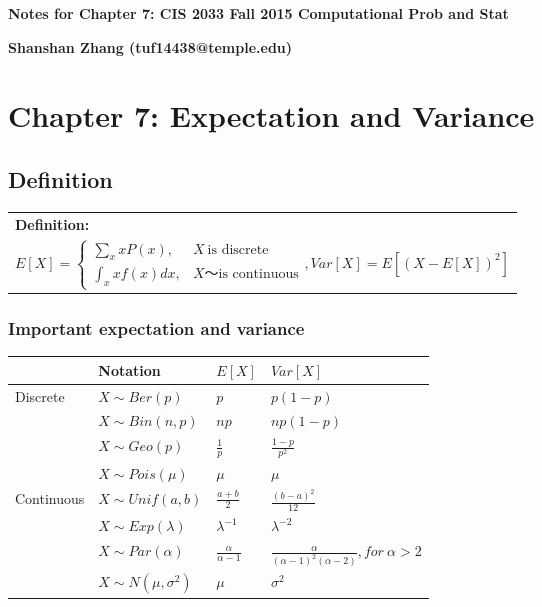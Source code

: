 \documentclass[11pt,epsfig]{article}
\begin{document}
\textbf{Notes for Chapter 7: CIS 2033 Fall 2015 Computational Prob and Stat}

\textbf{Shanshan Zhang {(tuf14438@temple.edu)} }


\section{Chapter 7: Expectation and Variance}
\subsection{Definition}
\begin{tabular}{|l|}
\hline
\textbf{Definition:}\\
$E[X]= \begin{cases} \sum_xxP(x), & X~ \text{is discrete}\\
\int_x xf(x)dx, &X～ \text{is continuous} \end{cases},Var[X]= E[(X-E[X])^2]$\\
\hline
\end{tabular}

\subsubsection{Important expectation and variance}
\begin{tabular}{ |l|l|l|l| }
\hline
& \bf{Notation }& \bf{$E[X]$} & \bf{$Var[X]$}\\ \hline
\multirow{3}{*}{Discrete} & $X\sim Ber(p)$ & $p$ & $p(1-p)$\\ \cline{2-4}
 & $X\sim Bin(n,p)$ & $np$& $np(1-p)$\\  \cline{2-4}
 & $X\sim Geo(p)$ & $\frac{1}{p}$& $\frac{1-p}{p^2}$\\ \cline{2-4}
 & $X\sim Pois(\mu)$ & $\mu$ & $\mu$\\ \hline
\multirow{4}{*}{Continuous} & $X\sim Unif(a,b)$ & $\frac{a+b}{2}$& $\frac{(b-a)^2}{12}$\\ \cline{2-4}
 & $X\sim Exp(\lambda)$ & $\lambda^{-1}$& $\lambda^{-2}$\\ \cline{2-4}
 & $X\sim Par(\alpha)$ & $\frac{\alpha}{\alpha-1}$& $\frac{\alpha}{(\alpha-1)^2(\alpha-2)},for ~\alpha >2$\\ \cline{2-4}
& $X\sim N(\mu,\sigma^2)$&$\mu$&$\sigma^2$\\ \hline
\end{tabular}
\end{document}
